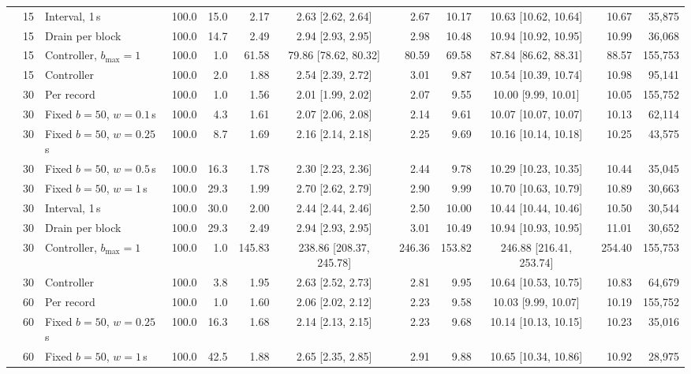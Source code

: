 \begin{table}[t]
\begin{adjustbox}{max width=\textwidth}
\begin{tabular}{lllrrrcrrcrr}
 & 15 & Interval, 1\,s & 100.0 & 15.0 & 2.17 & 2.63 [2.62, 2.64] & 2.67 & 10.17 & 10.63 [10.62, 10.64] & 10.67 & 35,875 \\
 & 15 & Drain per block & 100.0 & 14.7 & 2.49 & 2.94 [2.93, 2.95] & 2.98 & 10.48 & 10.94 [10.92, 10.95] & 10.99 & 36,068 \\
 & 15 & Controller, $b_{\max}{=}1$ & 100.0 & 1.0 & 61.58 & 79.86 [78.62, 80.32] & 80.59 & 69.58 & 87.84 [86.62, 88.31] & 88.57 & 155,753 \\
 & 15 & Controller & 100.0 & 2.0 & 1.88 & 2.54 [2.39, 2.72] & 3.01 & 9.87 & 10.54 [10.39, 10.74] & 10.98 & 95,141 \\
 & 30 & Per record & 100.0 & 1.0 & 1.56 & 2.01 [1.99, 2.02] & 2.07 & 9.55 & 10.00 [9.99, 10.01] & 10.05 & 155,752 \\
 & 30 & Fixed $b{=}50$, $w{=}0.1$\,s & 100.0 & 4.3 & 1.61 & 2.07 [2.06, 2.08] & 2.14 & 9.61 & 10.07 [10.07, 10.07] & 10.13 & 62,114 \\
 & 30 & Fixed $b{=}50$, $w{=}0.25$\,s & 100.0 & 8.7 & 1.69 & 2.16 [2.14, 2.18] & 2.25 & 9.69 & 10.16 [10.14, 10.18] & 10.25 & 43,575 \\
 & 30 & Fixed $b{=}50$, $w{=}0.5$\,s & 100.0 & 16.3 & 1.78 & 2.30 [2.23, 2.36] & 2.44 & 9.78 & 10.29 [10.23, 10.35] & 10.44 & 35,045 \\
 & 30 & Fixed $b{=}50$, $w{=}1$\,s & 100.0 & 29.3 & 1.99 & 2.70 [2.62, 2.79] & 2.90 & 9.99 & 10.70 [10.63, 10.79] & 10.89 & 30,663 \\
 & 30 & Interval, 1\,s & 100.0 & 30.0 & 2.00 & 2.44 [2.44, 2.46] & 2.50 & 10.00 & 10.44 [10.44, 10.46] & 10.50 & 30,544 \\
 & 30 & Drain per block & 100.0 & 29.3 & 2.49 & 2.94 [2.93, 2.95] & 3.01 & 10.49 & 10.94 [10.93, 10.95] & 11.01 & 30,652 \\
 & 30 & Controller, $b_{\max}{=}1$ & 100.0 & 1.0 & 145.83 & 238.86 [208.37, 245.78] & 246.36 & 153.82 & 246.88 [216.41, 253.74] & 254.40 & 155,753 \\
 & 30 & Controller & 100.0 & 3.8 & 1.95 & 2.63 [2.52, 2.73] & 2.81 & 9.95 & 10.64 [10.53, 10.75] & 10.83 & 64,679 \\
 & 60 & Per record & 100.0 & 1.0 & 1.60 & 2.06 [2.02, 2.12] & 2.23 & 9.58 & 10.03 [9.99, 10.07] & 10.19 & 155,752 \\
 & 60 & Fixed $b{=}50$, $w{=}0.25$\,s & 100.0 & 16.3 & 1.68 & 2.14 [2.13, 2.15] & 2.23 & 9.68 & 10.14 [10.13, 10.15] & 10.23 & 35,016 \\
 & 60 & Fixed $b{=}50$, $w{=}1$\,s & 100.0 & 42.5 & 1.88 & 2.65 [2.35, 2.85] & 2.91 & 9.88 & 10.65 [10.34, 10.86] & 10.92 & 28,975 \\

\end{tabular}
\end{adjustbox}
\end{table}
